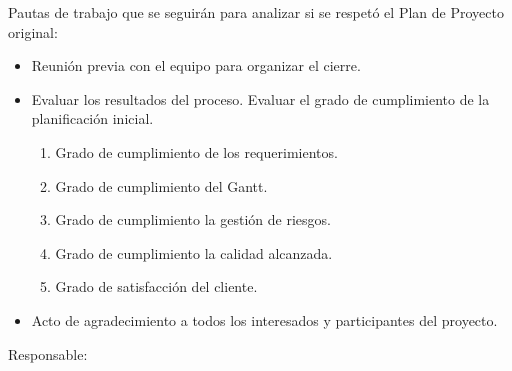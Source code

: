 \documentclass[11pt]{charter}
\begin{document}
Pautas de trabajo que se seguirán para analizar si se respetó el Plan de Proyecto original:

\begin{itemize}

\item Reunión previa con el equipo para organizar el cierre.

\item Evaluar los resultados del proceso. Evaluar el grado de cumplimiento de la planificación inicial.
\begin{enumerate}
\item Grado de cumplimiento de los requerimientos.
\item Grado de cumplimiento del Gantt.
\item Grado de cumplimiento la gestión de riesgos.
\item Grado de cumplimiento la calidad alcanzada.
\item Grado de satisfacción del cliente.
\end{enumerate}

\item Acto de agradecimiento a todos los interesados y participantes del proyecto.

\end{itemize}


Responsable: \authorname
\end{document}
